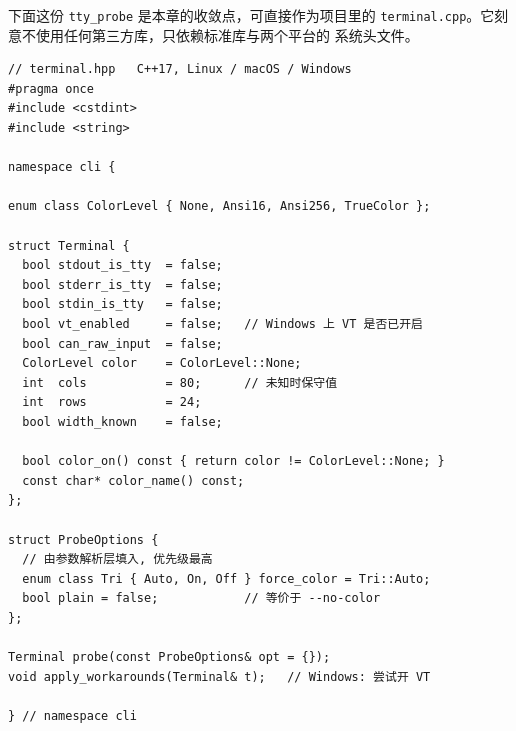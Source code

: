 \documentclass[12pt,a4paper,fontset=fandol]{ctexbook}
\newcommand{\Tp}[1]{\texttt{#1}}
\begin{document}
下面这份 \Tp{tty\_probe} 是本章的收敛点，可直接作为项目里的
\Tp{terminal.cpp}。它刻意不使用任何第三方库，只依赖标准库与两个平台的
系统头文件。

\begin{lstlisting}[caption={能力快照的数据结构（terminal.hpp）}]
// terminal.hpp   C++17, Linux / macOS / Windows
#pragma once
#include <cstdint>
#include <string>

namespace cli {

enum class ColorLevel { None, Ansi16, Ansi256, TrueColor };

struct Terminal {
  bool stdout_is_tty  = false;
  bool stderr_is_tty  = false;
  bool stdin_is_tty   = false;
  bool vt_enabled     = false;   // Windows 上 VT 是否已开启
  bool can_raw_input  = false;
  ColorLevel color    = ColorLevel::None;
  int  cols           = 80;      // 未知时保守值
  int  rows           = 24;
  bool width_known    = false;

  bool color_on() const { return color != ColorLevel::None; }
  const char* color_name() const;
};

struct ProbeOptions {
  // 由参数解析层填入, 优先级最高
  enum class Tri { Auto, On, Off } force_color = Tri::Auto;
  bool plain = false;            // 等价于 --no-color
};

Terminal probe(const ProbeOptions& opt = {});
void apply_workarounds(Terminal& t);   // Windows: 尝试开 VT

} // namespace cli
\end{lstlisting}
\end{document}

